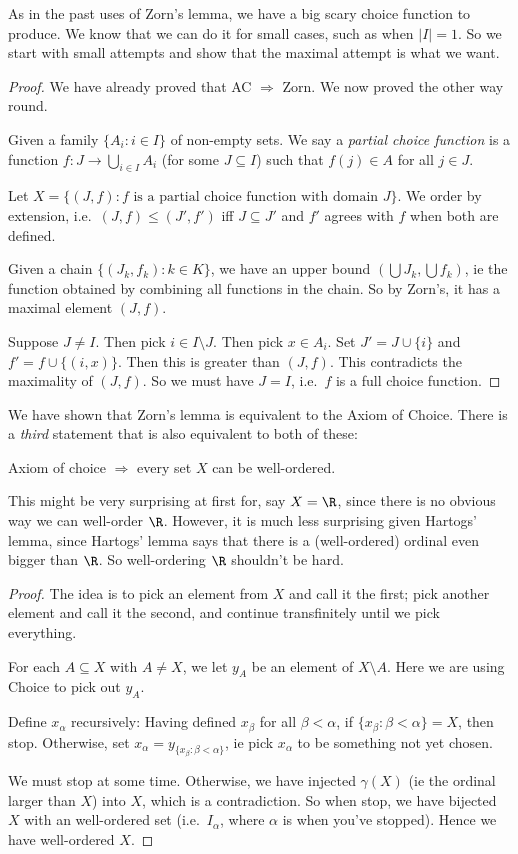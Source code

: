 \documentclass[a4paper]{article}
\begin{document}
As in the past uses of Zorn's lemma, we have a big scary choice function to produce. We know that we can do it for small cases, such as when $|I| = 1$. So we start with small attempts and show that the maximal attempt is what we want.
\begin{proof}
  We have already proved that AC $\Rightarrow $ Zorn. We now proved the other way round.

  Given a family $\{A_i: i\in I\}$ of non-empty sets. We say a \emph{partial choice function} is a function $f: J\to \bigcup_{i\in I}A_i$ (for some $J\subseteq I$) such that $f(j)\in A$ for all $j\in J$.

  Let $X = \{(J, f): f\text{ is a partial choice function with domain }J\}$. We order by extension, i.e.\ $(J, f) \leq (J', f')$ iff $J\subseteq J'$ and $f'$ agrees with $f$ when both are defined.

  Given a chain $\{(J_k, f_k): k\in K\}$, we have an upper bound $\left(\bigcup J_k, \bigcup f_k\right)$, ie the function obtained by combining all functions in the chain. So by Zorn's, it has a maximal element $(J, f)$.

  Suppose $J \not = I$. Then pick $i\in I\setminus J$. Then pick $x\in A_i$. Set $J' = J\cup \{i\}$ and $f' = f\cup\{(i, x)\}$. Then this is greater than $(J, f)$. This contradicts the maximality of $(J, f)$. So we must have $J = I$, i.e.\ $f$ is a full choice function.
\end{proof}

We have shown that Zorn's lemma is equivalent to the Axiom of Choice. There is a \emph{third} statement that is also equivalent to both of these:
\begin{thm}
  Axiom of choice $\Rightarrow$ every set $X$ can be well-ordered.
\end{thm}
This might be very surprising at first for, say $X = \R$, since there is no obvious way we can well-order $\R$. However, it is much less surprising given Hartogs' lemma, since Hartogs' lemma says that there is a (well-ordered) ordinal even bigger than $\R$. So well-ordering $\R$ shouldn't be hard.

\begin{proof}
  The idea is to pick an element from $X$ and call it the first; pick another element and call it the second, and continue transfinitely until we pick everything.

  For each $A\subseteq X$ with $A\not= X$, we let $y_A$ be an element of $X\setminus A$. Here we are using Choice to pick out $y_A$.

  Define $x_\alpha$ recursively: Having defined $x_{\beta}$ for all $\beta < \alpha$, if $\{x_\beta: \beta < \alpha\} = X$, then stop. Otherwise, set $x_\alpha = y_{\{x_\beta: \beta< \alpha\}}$, ie pick $x_\alpha$ to be something not yet chosen.

  We must stop at some time. Otherwise, we have injected $\gamma(X)$ (ie the ordinal larger than $X$) into $X$, which is a contradiction. So when stop, we have bijected $X$ with an well-ordered set (i.e.\ $I_\alpha$, where $\alpha$ is when you've stopped). Hence we have well-ordered $X$.
\end{proof}
\end{document}
